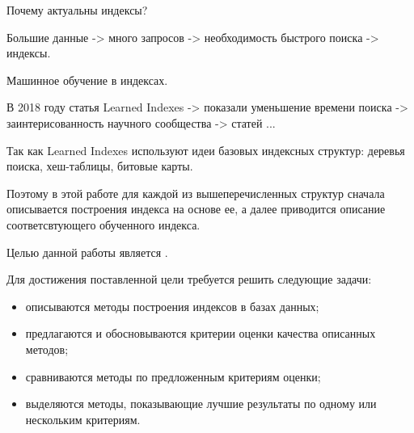 Почему актуальны индексы?

Большие данные -> много запросов -> необходимость быстрого поиска -> индексы.

Машинное обучение в индексах.

В 2018 году статья Learned Indexes -> показали уменьшение времени поиска ->
заинтерисованность научного сообщества ->  статей
\cite{1}\cite{2}\cite{3}...

Так как Learned Indexes используют идеи базовых индексных структур: деревья
поиска, хеш-таблицы, битовые карты.

Поэтому в этой работе для каждой из вышеперечисленных структур сначала
описывается построения индекса на основе ее, а далее приводится описание
соответсвтующего обученного индекса.

Целью данной работы является .

Для достижения поставленной цели требуется решить следующие задачи:
\begin{itemize}
    \item описываются методы построения индексов в базах данных;
    \item предлагаются и обосновываются критерии оценки качества описанных методов;
    \item сравниваются методы по предложенным критериям оценки;
    \item выделяются методы, показывающие лучшие результаты по одному или
        нескольким критериям.
\end{itemize}
